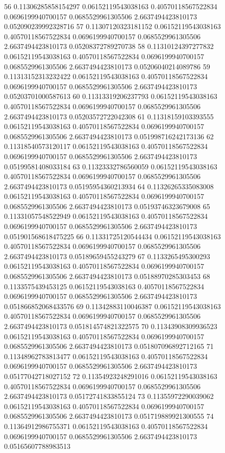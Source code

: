 {56 0.11306285858154297 0.06152119543038163 0.40570118567522834 0.0696199940700157 0.0685529961305506 2.6637494423810173 0.052090239992328716
57 0.11307120323181152 0.06152119543038163 0.40570118567522834 0.0696199940700157 0.0685529961305506 2.6637494423810173 0.05208372789270738
58 0.11310124397277832 0.06152119543038163 0.40570118567522834 0.0696199940700157 0.0685529961305506 2.6637494423810173 0.05206040214089786
59 0.11313152313232422 0.06152119543038163 0.40570118567522834 0.0696199940700157 0.0685529961305506 2.6637494423810173 0.05203701000587613
60 0.11313319206237793 0.06152119543038163 0.40570118567522834 0.0696199940700157 0.0685529961305506 2.6637494423810173 0.05203572722042308
61 0.11318159103393555 0.06152119543038163 0.40570118567522834 0.0696199940700157 0.0685529961305506 2.6637494423810173 0.051998716242173136
62 0.11318540573120117 0.06152119543038163 0.40570118567522834 0.0696199940700157 0.0685529961305506 2.6637494423810173 0.05199581408033184
63 0.11323332786560059 0.06152119543038163 0.40570118567522834 0.0696199940700157 0.0685529961305506 2.6637494423810173 0.05195954360213934
64 0.11326265335083008 0.06152119543038163 0.40570118567522834 0.0696199940700157 0.0685529961305506 2.6637494423810173 0.05193746323679008
65 0.11331057548522949 0.06152119543038163 0.40570118567522834 0.0696199940700157 0.0685529961305506 2.6637494423810173 0.051901568618475225
66 0.11331725120544434 0.06152119543038163 0.40570118567522834 0.0696199940700157 0.0685529961305506 2.6637494423810173 0.05189659455243279
67 0.1133265495300293 0.06152119543038163 0.40570118567522834 0.0696199940700157 0.0685529961305506 2.6637494423810173 0.05188970285303453
68 0.1133575439453125 0.06152119543038163 0.40570118567522834 0.0696199940700157 0.0685529961305506 2.6637494423810173 0.051866852068433576
69 0.11342883110046387 0.06152119543038163 0.40570118567522834 0.0696199940700157 0.0685529961305506 2.6637494423810173 0.051814574821322575
70 0.11343908309936523 0.06152119543038163 0.40570118567522834 0.0696199940700157 0.0685529961305506 2.6637494423810173 0.051807096892712165
71 0.11348962783813477 0.06152119543038163 0.40570118567522834 0.0696199940700157 0.0685529961305506 2.6637494423810173 0.05177042718027152
72 0.11354923248291016 0.06152119543038163 0.40570118567522834 0.0696199940700157 0.0685529961305506 2.6637494423810173 0.05172741833855124
73 0.11355972290039062 0.06152119543038163 0.40570118567522834 0.0696199940700157 0.0685529961305506 2.6637494423810173 0.051719889921300555
74 0.11364912986755371 0.06152119543038163 0.40570118567522834 0.0696199940700157 0.0685529961305506 2.6637494423810173 0.05165607788983513
}
